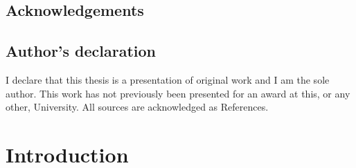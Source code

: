 \setcounter{tocdepth}{3}
\tableofcontents

\newpage

\listoffigures

\newpage

\listoftables

\newpage




\section{Acknowledgements}

\newpage

\section{Author's declaration}

\label{sec:declaration}

I declare that this thesis is a presentation of original work and I am the sole author. This work has not previously been presented for an award at this, or any other, University. All sources are acknowledged as References. 

\newpage



\setcounter{secnumdepth}{4}

\pagestyle{fancy}
\renewcommand{\headrulewidth}{0pt}
\rhead{\slshape\nouppercase{\leftmark}}
\lhead[E,O]{}


\chapter{Introduction} \label{chapter:introduction}


